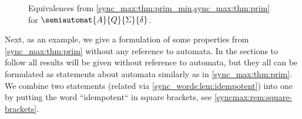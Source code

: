 \begin{figure}[ht]
	\centering
	
	\caption[Equivalences for automata with primitive group in transformation semigroup]{Equivalences  from \cref{sync_max:thm:prim_min,sync_max:thm:prim} for $\semiautomat{A}{Q}{\Sigma}{\delta}$.}
	\label{sync_max:fig:equivalences_perm_aut}
\end{figure}
Next, as an example,
we give a formulation of some properties from \cref{sync_max:thm:prim}
without any reference to automata. In the sections
to follow all results will be given without reference
to automata, but they all can be formulated
as statements about automata similarly as in \cref{sync_max:thm:prim}. 
We combine two statements (related via \cref{sync_words:lem:idempotent})
into one by putting the word ``idempotent``
in square brackets, see \cref{syncmax:rem:square-brackets}.


